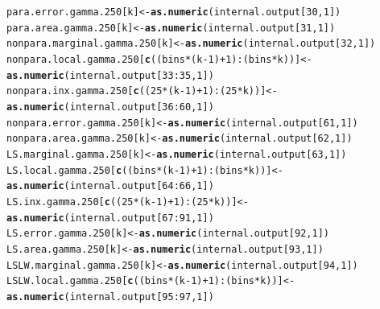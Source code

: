 \documentclass[11pt]{article}\usepackage[]{graphicx}\usepackage[]{color}
\makeatletter
\newcommand{\hlnum}[1]{\textcolor[rgb]{0.686,0.059,0.569}{#1}}%
\newcommand{\hlopt}[1]{\textcolor[rgb]{0,0,0}{#1}}%
\newcommand{\hlstd}[1]{\textcolor[rgb]{0.345,0.345,0.345}{#1}}%
\newcommand{\hlkwb}[1]{\textcolor[rgb]{0.69,0.353,0.396}{#1}}%
\newcommand{\hlkwd}[1]{\textcolor[rgb]{0.737,0.353,0.396}{\textbf{#1}}}%
\newenvironment{kframe}{%
 \def\at@end@of@kframe{}%
 \ifinner\ifhmode%
  \def\at@end@of@kframe{\end{minipage}}%
  \begin{minipage}{\columnwidth}%
 \fi\fi%
 \def\FrameCommand##1{\hskip\@totalleftmargin \hskip-\fboxsep
 \colorbox{shadecolor}{##1}\hskip-\fboxsep
     \hskip-\linewidth \hskip-\@totalleftmargin \hskip\columnwidth}%
 \MakeFramed {\advance\hsize-\width
   \@totalleftmargin\z@ \linewidth\hsize
   \@setminipage}}%
 {\par\unskip\endMakeFramed%
 \at@end@of@kframe}
\newenvironment{knitrout}{}{} %
\makeatother
\begin{document}
\begin{knitrout}
\begin{kframe}
\begin{alltt}
  \hlstd{para.error.gamma.250[k]} \hlkwb{<-} \hlkwd{as.numeric}\hlstd{(internal.output[}\hlnum{30}\hlstd{,} \hlnum{1}\hlstd{])}
  \hlstd{para.area.gamma.250[k]} \hlkwb{<-} \hlkwd{as.numeric}\hlstd{(internal.output[}\hlnum{31}\hlstd{,} \hlnum{1}\hlstd{])}
  \hlstd{nonpara.marginal.gamma.250[k]} \hlkwb{<-} \hlkwd{as.numeric}\hlstd{(internal.output[}\hlnum{32}\hlstd{,} \hlnum{1}\hlstd{])}
  \hlstd{nonpara.local.gamma.250[}\hlkwd{c}\hlstd{((bins}\hlopt{*}\hlstd{(k}\hlopt{-}\hlnum{1}\hlstd{)}\hlopt{+}\hlnum{1}\hlstd{)}\hlopt{:}\hlstd{(bins}\hlopt{*}\hlstd{k))]} \hlkwb{<-}
    \hlkwd{as.numeric}\hlstd{(internal.output[}\hlnum{33}\hlopt{:}\hlnum{35}\hlstd{,} \hlnum{1}\hlstd{])}
  \hlstd{nonpara.inx.gamma.250[}\hlkwd{c}\hlstd{((}\hlnum{25}\hlopt{*}\hlstd{(k}\hlopt{-}\hlnum{1}\hlstd{)}\hlopt{+}\hlnum{1}\hlstd{)}\hlopt{:}\hlstd{(}\hlnum{25}\hlopt{*}\hlstd{k))]} \hlkwb{<-}
    \hlkwd{as.numeric}\hlstd{(internal.output[}\hlnum{36}\hlopt{:}\hlnum{60}\hlstd{,} \hlnum{1}\hlstd{])}
  \hlstd{nonpara.error.gamma.250[k]} \hlkwb{<-} \hlkwd{as.numeric}\hlstd{(internal.output[}\hlnum{61}\hlstd{,} \hlnum{1}\hlstd{])}
  \hlstd{nonpara.area.gamma.250[k]} \hlkwb{<-} \hlkwd{as.numeric}\hlstd{(internal.output[}\hlnum{62}\hlstd{,} \hlnum{1}\hlstd{])}
  \hlstd{LS.marginal.gamma.250[k]} \hlkwb{<-} \hlkwd{as.numeric}\hlstd{(internal.output[}\hlnum{63}\hlstd{,} \hlnum{1}\hlstd{])}
  \hlstd{LS.local.gamma.250[}\hlkwd{c}\hlstd{((bins}\hlopt{*}\hlstd{(k}\hlopt{-}\hlnum{1}\hlstd{)}\hlopt{+}\hlnum{1}\hlstd{)}\hlopt{:}\hlstd{(bins}\hlopt{*}\hlstd{k))]} \hlkwb{<-}
    \hlkwd{as.numeric}\hlstd{(internal.output[}\hlnum{64}\hlopt{:}\hlnum{66}\hlstd{,} \hlnum{1}\hlstd{])}
  \hlstd{LS.inx.gamma.250[}\hlkwd{c}\hlstd{((}\hlnum{25}\hlopt{*}\hlstd{(k}\hlopt{-}\hlnum{1}\hlstd{)}\hlopt{+}\hlnum{1}\hlstd{)}\hlopt{:}\hlstd{(}\hlnum{25}\hlopt{*}\hlstd{k))]} \hlkwb{<-}
    \hlkwd{as.numeric}\hlstd{(internal.output[}\hlnum{67}\hlopt{:}\hlnum{91}\hlstd{,} \hlnum{1}\hlstd{])}
  \hlstd{LS.error.gamma.250[k]} \hlkwb{<-} \hlkwd{as.numeric}\hlstd{(internal.output[}\hlnum{92}\hlstd{,} \hlnum{1}\hlstd{])}
  \hlstd{LS.area.gamma.250[k]} \hlkwb{<-} \hlkwd{as.numeric}\hlstd{(internal.output[}\hlnum{93}\hlstd{,} \hlnum{1}\hlstd{])}
  \hlstd{LSLW.marginal.gamma.250[k]} \hlkwb{<-} \hlkwd{as.numeric}\hlstd{(internal.output[}\hlnum{94}\hlstd{,} \hlnum{1}\hlstd{])}
  \hlstd{LSLW.local.gamma.250[}\hlkwd{c}\hlstd{((bins}\hlopt{*}\hlstd{(k}\hlopt{-}\hlnum{1}\hlstd{)}\hlopt{+}\hlnum{1}\hlstd{)}\hlopt{:}\hlstd{(bins}\hlopt{*}\hlstd{k))]} \hlkwb{<-}
    \hlkwd{as.numeric}\hlstd{(internal.output[}\hlnum{95}\hlopt{:}\hlnum{97}\hlstd{,} \hlnum{1}\hlstd{])}

\end{alltt}
\end{kframe}
\end{knitrout}
\end{document}
